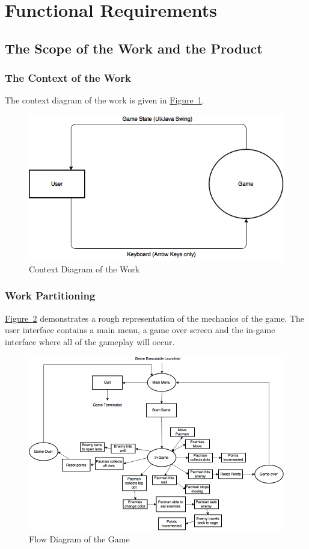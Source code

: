 \documentclass[12pt, titlepage]{article}
\begin{document}
\section{Functional Requirements}

\subsection{The Scope of the Work and the Product}

\subsubsection{The Context of the Work}
The context diagram of the work is given in \hyperref[fig:gamecontext]{Figure~\ref*{fig:gamecontext}}.
\begin{figure}[H]
\includegraphics[width=\textwidth]{gamecontext}
\caption{Context Diagram of the Work} \label{fig:gamecontext}
\end{figure}

\subsubsection{Work Partitioning}
\hyperref[fig:flow-3]{Figure~\ref*{fig:flow-3}} demonstrates a rough representation of the mechanics of the game. The user interface contains a main menu, a game over screen and the in-game interface where all of the gameplay will occur.

\begin{figure}[H]
\includegraphics[width=\textwidth]{flow-3}
\caption{Flow Diagram of the Game} \label{fig:flow-3}
\end{figure}
\end{document}
